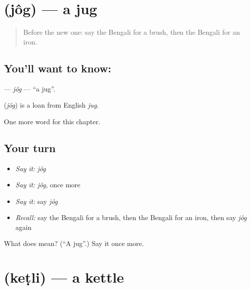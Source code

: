 \section[\texorpdfstring{\bn{জগ} (jôg)}{জগ (jôg)}]{ (jôg) — a jug}

\label{lesson:BN-C194-jog}



\begin{quote}
Before the new one: say the Bengali for a brush, then the Bengali for an iron.
\end{quote}

\subsection*{You'll want to know: }
\textbf{} — \emph{jôg} — \textquotedblleft{}a jug\textquotedblright{}.

\begin{cousinweb}
\textbf{} (\emph{jôg}) is a loan from English \emph{jug}.
\end{cousinweb}

\begin{grammarlens}[title={What you've built}]
One more word for this chapter.
\end{grammarlens}

\subsection*{Your turn}
\begin{itemize}
\raggedright
  \item \emph{Say it:} \emph{jôg}
  \item \emph{Say it:} \emph{jôg}, once more
  \item \emph{Say it:} say \emph{jôg}
  \item \emph{Recall:} say the Bengali for a brush, then the Bengali for an iron, then say \emph{jôg} again
\end{itemize}

\begin{tcolorbox}[breakable,colback=teal!4,colframe=teal!35!black,title={Before you move on}]
What does  mean? (\textquotedblleft{}A jug\textquotedblright{}.) Say it once more.
\end{tcolorbox}
\section[\texorpdfstring{\bn{কেটলি} (keṭli)}{কেটলি (keṭli)}]{ (keṭli) — a kettle}

